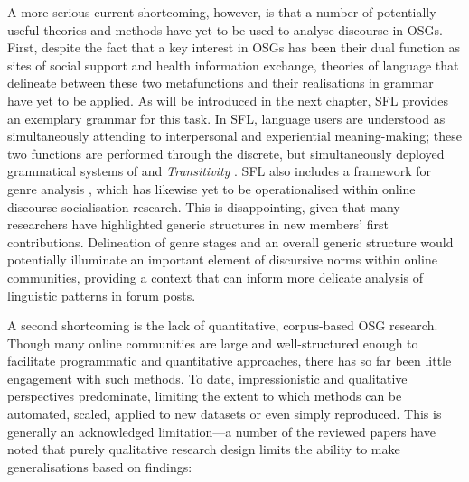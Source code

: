 A more serious current shortcoming, however, is that a number of potentially useful theories and methods have yet to be used to analyse discourse in \glspl{OSG}. First, despite the fact that a key interest in \glspl{OSG} has been their dual function as sites of social support and health information exchange, theories of language that delineate between these two metafunctions and their realisations in grammar have yet to be applied. As will be introduced in the next chapter, \gls{SFL} provides an exemplary grammar for this task. In \gls{SFL}, language users are understood as simultaneously attending to interpersonal and experiential meaning\hyp{}making; these two functions are performed through the discrete, but simultaneously deployed grammatical systems of  and \emph{Transitivity} \cite{halliday_introduction:_2004}. \gls{SFL} also includes a framework for genre analysis \cite[e.g.][]{eggins_analysing_2004}, which has likewise yet to be operationalised within online discourse socialisation research. This is disappointing, given that many researchers have highlighted generic structures in new members' first contributions. Delineation of genre stages and an overall generic structure would potentially illuminate an important element of discursive norms within online communities, providing a context that can inform more delicate analysis of linguistic patterns in \gls{forum} \glspl{post}.




A second shortcoming is the lack of quantitative, corpus\hyp{}based \gls{OSG} research. Though many online communities are large and well\hyp{}structured enough to facilitate programmatic and quantitative approaches, there has so far been little engagement with such methods. To date, impressionistic and qualitative perspectives predominate, limiting the extent to which methods can be automated, scaled, applied to new datasets or even simply reproduced. This is generally an acknowledged limitation---a number of the reviewed papers have noted that purely qualitative research design limits the ability to make generalisations based on findings:

